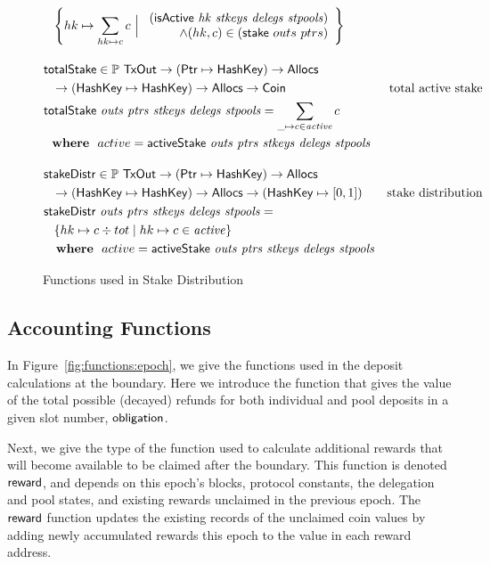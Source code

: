 \begin{figure}[htb]
\begin{align*}
      & ~~ \left\{
             hk\mapsto \sum_{hk\mapsto c}c
             ~\Big\vert~
             \begin{array}{r}
             (\isActive{hk}{stkeys}{delegs}{stpools}) \\
             \land (hk, c) \in (\fun{stake}~{outs}~{ptrs})
             \end{array}
           \right\}
      \nextdef
      & \fun{totalStake} \in \powerset{\TxOut} \to (\Ptr \mapsto \HashKey) \to \Allocs\\
      & ~~\to (\HashKey \mapsto \HashKey) \to \Allocs \to \Coin
      & \text{total active stake} \\
      & \fun{totalStake}~\var{outs}~\var{ptrs}~\var{stkeys}~\var{delegs}~\var{stpools} =
        \sum_{\_\mapsto c\in \var{active}}c \\
      & \where active = \activeStake{outs}{ptrs}{stkeys}{delegs}{stpools}
      \nextdef
      & \fun{stakeDistr} \in \powerset{\TxOut} \to (\Ptr \mapsto \HashKey) \to \Allocs\\
      & ~~\to (\HashKey \mapsto \HashKey) \to \Allocs \to (\HashKey \mapsto [0, 1])
      & \text{stake distribution} \\
      & \fun{stakeDistr}~\var{outs}~\var{ptrs}~\var{stkeys}~\var{delegs}~\var{stpools} = \\
      & ~~ \left\{ hk\mapsto c \div tot \mid hk \mapsto c \in \var{active} \right\}\\
      & ~\where active = \activeStake{outs}{ptrs}{stkeys}{delegs}{stpools}
  \end{align*}
  \caption{Functions used in Stake Distribution}
  \label{fig:functions:stake-distribution}
\end{figure}

\subsection{Accounting Functions}
\label{sec:acc-fun}

In Figure~\ref{fig:functions:epoch}, we give the functions
used in the deposit calculations at the boundary. Here we introduce the function
that gives the value of the total possible (decayed) refunds for both individual and
pool deposits in a given slot number, $\mathsf{obligation}$.

Next, we give the type of the function used to calculate additional rewards that will become
available to be claimed after the boundary. This function is denoted $\mathsf{reward}$,
and depends on this epoch's blocks, protocol constants, the delegation
and pool states, and existing rewards unclaimed in the previous epoch.
The $\mathsf{reward}$ function
updates the existing records of the unclaimed coin values by adding newly
accumulated rewards this epoch to the value in each reward address.

